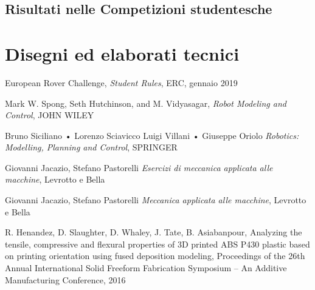 \documentclass[%
corpo=11pt,
twoside,
 stile=classica,
oldstyle,
greek,%
]{toptesi}
\begin{document}
	\section{Risultati nelle Competizioni studentesche }

\backmatter
\chapter{Disegni ed elaborati tecnici}







\begin{thebibliography}{9}
 European Rover Challenge, \emph{Student Rules}, ERC, gennaio 2019

Mark W. Spong, Seth Hutchinson, and M. Vidyasagar, \emph{Robot Modeling and Control}, JOHN WILEY  

Bruno Siciliano • Lorenzo Sciavicco Luigi Villani • Giuseppe Oriolo \emph{Robotics: Modelling, Planning and Control}, SPRINGER

Giovanni Jacazio, Stefano Pastorelli \emph{Esercizi di meccanica applicata alle macchine}, Levrotto e Bella

Giovanni Jacazio, Stefano Pastorelli \emph{Meccanica applicata alle macchine}, Levrotto e Bella

 R. Henandez, D. Slaughter, D. Whaley, J. Tate, B. Asiabanpour, Analyzing the tensile, compressive and flexural properties of 3D printed ABS P430 plastic based on printing orientation using fused deposition modeling, Proceedings of the 26th Annual International Solid Freeform Fabrication Symposium – An Additive Manufacturing Conference, 2016
\end{thebibliography}
\end{document}
